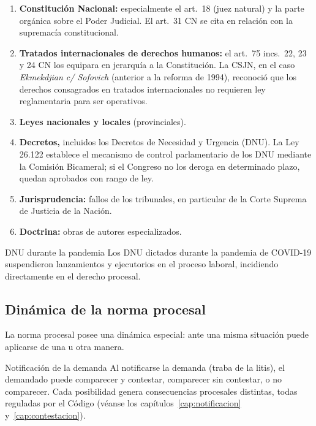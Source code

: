 \documentclass[12pt,oneside]{book}
\begin{document}
\begin{enumerate}
\item \textbf{Constitución Nacional:} especialmente el art.~18 (juez natural) y la parte orgánica sobre el Poder Judicial. El art.~31 CN se cita en relación con la supremacía constitucional.
\item \textbf{Tratados internacionales de derechos humanos:} el art.~75 incs.~22, 23 y 24 CN los equipara en jerarquía a la Constitución. La CSJN, en el caso \textit{Ekmekdjian c/ Sofovich} (anterior a la reforma de 1994), reconoció que los derechos consagrados en tratados internacionales no requieren ley reglamentaria para ser operativos.
\item \textbf{Leyes nacionales y locales} (provinciales).
\item \textbf{Decretos,} incluidos los Decretos de Necesidad y Urgencia (DNU). La Ley 26.122 establece el mecanismo de control parlamentario de los DNU mediante la Comisión Bicameral; si el Congreso no los deroga en determinado plazo, quedan aprobados con rango de ley.
\item \textbf{Jurisprudencia:} fallos de los tribunales, en particular de la Corte Suprema de Justicia de la Nación.
\item \textbf{Doctrina:} obras de autores especializados.
\end{enumerate}

\begin{example}{DNU durante la pandemia}
Los DNU dictados durante la pandemia de COVID-19 suspendieron lanzamientos y ejecutorios en el proceso laboral, incidiendo directamente en el derecho procesal.
\end{example}

\subsection{Dinámica de la norma procesal}

La norma procesal posee una dinámica especial: ante una misma situación puede aplicarse de una u otra manera.

\begin{example}{Notificación de la demanda}
Al notificarse la demanda (traba de la litis), el demandado puede comparecer y contestar, comparecer sin contestar, o no comparecer. Cada posibilidad genera consecuencias procesales distintas, todas reguladas por el Código (véanse los capítulos~\ref{cap:notificacion} y~\ref{cap:contestacion}).
\end{example}
\end{document}
